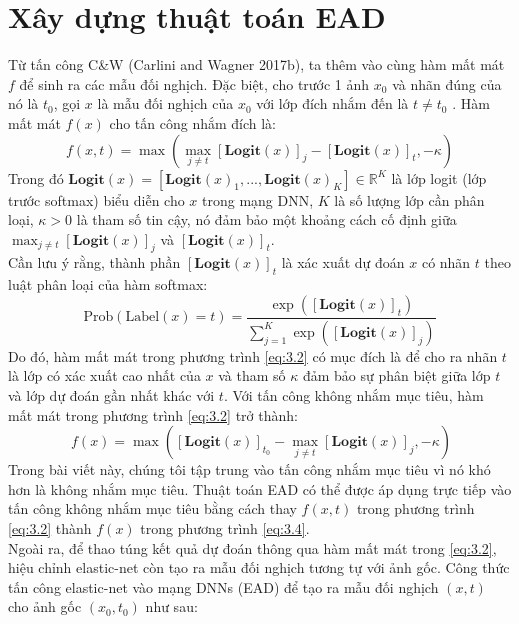 \section{Xây dựng thuật toán EAD}

Từ tấn công C\&W (Carlini and Wagner 2017b), ta thêm vào cùng hàm mất mát $f$ để sinh 
ra các mẫu đối nghịch. Đặc biệt, cho trước 1 ảnh $x_0$ và nhãn đúng của nó là $t_0$, 
gọi $x$ là mẫu đối nghịch của $x_0$ với lớp đích nhắm đến là $t \neq t_0$ . Hàm mất mát 
$f(x)$ cho tấn công nhắm đích là:
\begin{equation}
    \label{eq:3.2}
    f(x, t) = \max { \left( \max_{j \neq t} [\textbf{Logit}(x)]_j - 
    [\textbf{Logit}(x)]_t, -\kappa \right) }
\end{equation}
Trong đó $\textbf{Logit}(x) = [\textbf{Logit}(x)_1, ..., \textbf{Logit}(x)_K] 
\in \mathbb{R}^K$ là lớp logit (lớp trước softmax) biểu diễn cho $x$ trong mạng DNN, $K$
là số lượng lớp cần phân loại, $\kappa > 0$ là tham số tin cậy, nó đảm bảo một khoảng 
cách cố định giữa $\max_{j \neq t} [\textbf{Logit}(x)]_j$ và $[\textbf{Logit}(x)]_t$. \\

Cần lưu ý rằng, thành phần $[\textbf{Logit}(x)]_t$ là xác xuất dự đoán $x$ có nhãn $t$ theo 
luật phân loại của hàm softmax:
\begin{equation}
    \label{eq:3.3}
    \text{Prob}(\text{Label}(x) = t) = \frac{\exp([\textbf{Logit}(x)]_t)}{
        \sum_{j=1}^{K} \exp([\textbf{Logit}(x)]_j)
    }
\end{equation}
Do đó, hàm mất mát trong phương trình \ref{eq:3.2} có mục đích là để cho ra nhãn $t$ là 
lớp có xác xuất cao nhất của $x$ và tham số $\kappa$ đảm bảo sự phân biệt giữa lớp $t$
và lớp dự đoán gần nhất khác với $t$. Với tấn công không nhắm mục tiêu, hàm mất mát trong 
phương trình \ref{eq:3.2} trở thành:
\begin{equation}
    \label{eq:3.4}\
    f(x) = \max { \left([\textbf{Logit}(x)]_{t_0} - 
    \max_{j \neq t} [\textbf{Logit}(x)]_j, -\kappa \right) }
\end{equation}
Trong bài viết này, chúng tôi tập trung vào tấn công nhắm mục tiêu vì nó khó hơn là không 
nhắm mục tiêu. Thuật toán EAD có thể được áp dụng trực tiếp vào tấn công không nhắm mục 
tiêu bằng cách thay $f(x,t)$ trong phương trình \ref{eq:3.2} thành $f(x)$ trong phương 
trình \ref{eq:3.4}. \\

Ngoài ra, để thao túng kết quả dự đoán thông qua hàm mất mát trong \ref{eq:3.2}, hiệu chỉnh 
elastic-net còn tạo ra mẫu đối nghịch tương tự với ảnh gốc. Công thức tấn công elastic-net
vào mạng DNNs (EAD) để tạo ra mẫu đối nghịch $(x,t)$ cho ảnh gốc $(x_0, t_0)$ như sau:


